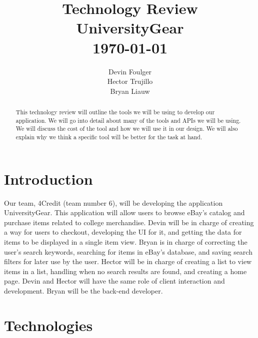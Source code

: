\documentclass[journal,compsoc, 10pt, draftclsnofoot, onecolumn]{IEEEtran}
\begin{document}
\title{\vspace{20em}Technology Review \\{\vspace{-1ex}\huge UniversityGear} \\
{\large \today}}
\author{\vspace{10ex}Devin Foulger \\{\vspace{-1ex}Hector Trujillo}
\\{\vspace{-1ex}Bryan Liauw}}

\begin{titlepage}

\maketitle
\thispagestyle{empty}
\begin{abstract}
This technology review will outline the tools we will be using to develop our 
application. We will go into detail about many of the tools and APIs we will be 
using. We will discuss the cost of the tool and how we will use it in our design. 
We will also explain why we think a specific tool will be better for the task at
 hand.
\end{abstract}

\end{titlepage}

\tableofcontents

\section{Introduction}
Our team, 4Credit (team number 6), will be developing the application UniversityGear. 
This application will allow users to browse eBay's catalog and purchase items 
related to college merchandise. Devin will be in charge of creating a way for 
users to checkout, developing the UI for it, and getting the data for items to
be displayed in a single item view. Bryan is in charge of correcting the user's 
search keywords, searching for items in eBay's database, and saving search 
filters for later use by the user. Hector will be in charge of creating a list to 
view items in a list, handling when no search results are found, and creating
a home page. Devin and Hector will have the same role of client interaction and
development. Bryan will be the back-end developer.

\section{Technologies}
\end{document}
